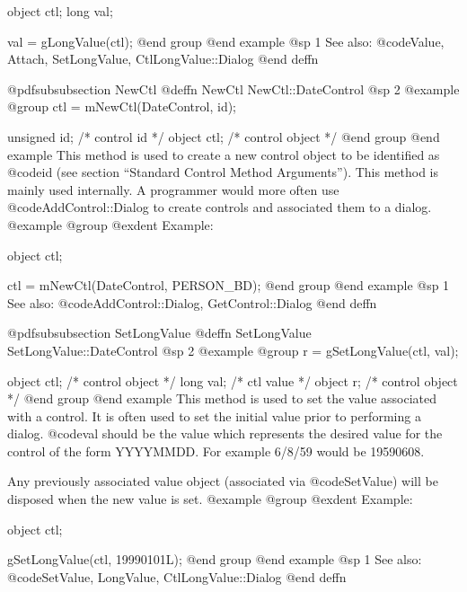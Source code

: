 object  ctl;
long    val;

val = gLongValue(ctl);
@end group
@end example
@sp 1
See also:  @code{Value, Attach, SetLongValue, CtlLongValue::Dialog}
@end deffn










@pdfsubsubsection {NewCtl}
@deffn {NewCtl} NewCtl::DateControl
@sp 2
@example
@group
ctl = mNewCtl(DateControl, id);

unsigned  id;   /*  control id      */
object   ctl;   /*  control object  */
@end group
@end example
This method is used to create a new control object to be identified as
@code{id} (see section ``Standard Control Method Arguments'').  This
method is mainly used internally.  A programmer would more often
use @code{AddControl::Dialog} to create controls and associated them
to a dialog.
@example
@group
@exdent Example:

object  ctl;

ctl = mNewCtl(DateControl, PERSON_BD);
@end group
@end example
@sp 1
See also:  @code{AddControl::Dialog, GetControl::Dialog}
@end deffn










@pdfsubsubsection {SetLongValue}
@deffn {SetLongValue} SetLongValue::DateControl
@sp 2
@example
@group
r = gSetLongValue(ctl, val);

object  ctl;    /*  control object  */
long    val;    /*  ctl value       */
object  r;      /*  control object  */
@end group
@end example
This method is used to set the value associated with a control.  It is
often used to set the initial value prior to performing a dialog.
@code{val} should be the value which represents the desired value for
the control of the form YYYYMMDD.  For example 6/8/59 would be
19590608.

Any previously associated value object (associated via @code{SetValue})
will be disposed when the new value is set.
@example
@group
@exdent Example:

object  ctl;

gSetLongValue(ctl, 19990101L);
@end group
@end example
@sp 1
See also:  @code{SetValue, LongValue, CtlLongValue::Dialog}
@end deffn














